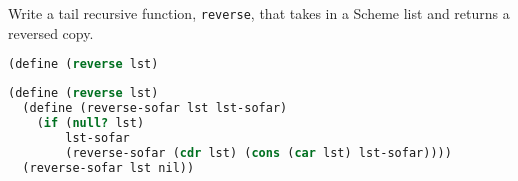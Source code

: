 \question
Write a tail recursive function, \texttt{reverse}, that takes in a Scheme list
and returns a reversed copy.
\begin{lstlisting}[language=Scheme]
(define (reverse lst)
\end{lstlisting}
\begin{solution}[1.5in]
\begin{lstlisting}[language=Scheme]
(define (reverse lst)
  (define (reverse-sofar lst lst-sofar)
    (if (null? lst)
        lst-sofar
        (reverse-sofar (cdr lst) (cons (car lst) lst-sofar))))
  (reverse-sofar lst nil))
\end{lstlisting}
\end{solution}
